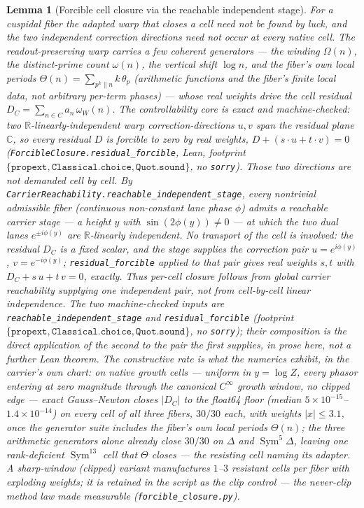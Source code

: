 \documentclass[11pt]{article}
\newtheorem{lemma}[theorem]{Lemma}
\theoremstyle{definition}
\newcommand{\Sym}{\operatorname{Sym}}
\begin{document}
\begin{lemma}[Forcible cell closure via the reachable independent stage]\label{lem:forcible}
For a cuspidal fiber the adapted warp that closes a cell need not be found by luck, and the two independent
correction directions need \emph{not} occur at every native cell. The readout-preserving warp carries a few
\emph{coherent} generators --- the winding $\Omega(n)$, the distinct-prime count $\omega(n)$, the vertical shift
$\log n$, and the fiber's own local periods $\Theta(n)=\sum_{p^k\|n}k\,\theta_p$ (arithmetic functions and the
fiber's finite local data, not arbitrary per-term phases) --- whose real weights drive the cell residual
$D_C=\sum_{n\in C}a_n\,\omega_W(n)$. The controllability core is exact and machine-checked: two
$\mathbb R$-linearly-independent warp correction-directions $u,v$ span the residual plane $\mathbb C$, so
\emph{every} residual $D$ is forcible to zero by real weights, $D+(s\!\cdot\! u+t\!\cdot\! v)=0$
(\texttt{ForcibleClosure.residual\_forcible}, Lean, footprint
$\{\texttt{propext},\texttt{Classical.choice},\texttt{Quot.sound}\}$, no \texttt{sorry}). Those two directions are
not demanded cell by cell. By \texttt{CarrierReachability.reachable\_independent\_stage}, every nontrivial
admissible fiber (continuous non-constant lane phase $\phi$) admits a reachable carrier \emph{stage} --- a height
$y$ with $\sin(2\phi(y))\neq0$ --- at which the two dual lanes $e^{\pm i\phi(y)}$ are $\mathbb R$-linearly
independent. No transport of the cell is involved: the residual $D_C$ is a fixed scalar, and the stage supplies
the correction pair $u=e^{i\phi(y)}$, $v=e^{-i\phi(y)}$; \texttt{residual\_forcible} applied to that pair gives
real weights $s,t$ with $D_C+s\,u+t\,v=0$, exactly. Thus per-cell closure follows from \emph{global} carrier
reachability supplying one independent pair, \emph{not} from cell-by-cell linear independence. The two
machine-checked inputs are \texttt{reachable\_independent\_stage} and \texttt{residual\_forcible} (footprint
$\{\texttt{propext},\texttt{Classical.choice},\texttt{Quot.sound}\}$, no \texttt{sorry}); their composition is
the direct application of the second to the pair the first supplies, in prose here, not a further Lean theorem.
The constructive rate is what the numerics exhibit, \emph{in the carrier's own chart}: on native growth
cells --- uniform in $y=\log Z$, every phasor entering at zero magnitude through the canonical $C^{\infty}$
growth window, no clipped edge --- exact Gauss--Newton closes $|D_C|$ to the float64 floor (median
$5\times10^{-15}$--$1.4\times10^{-14}$) on \emph{every} cell of all three fibers, $30/30$ each, with weights
$|x|\le3.1$, once the generator suite includes the fiber's own local periods $\Theta(n)$; the three arithmetic
generators alone already close $30/30$ on $\Delta$ and $\Sym^5\Delta$, leaving one rank-deficient
$\Sym^{13}$ cell that $\Theta$ closes --- the resisting cell naming its adapter. A sharp-window (clipped)
variant manufactures $1$--$3$ resistant cells per fiber with exploding weights; it is retained in the script
as the clip control --- the never-clip method law made measurable (\texttt{forcible\_closure.py}).
\end{lemma}
\end{document}
